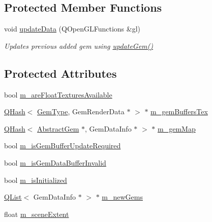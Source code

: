 \subsection*{Protected Member Functions}
\begin{DoxyCompactItemize}
\item 
void \hyperlink{class_gem_renderer_ada5ea2f54e918b16879d378cf84dab42}{update\+Data} (Q\+Open\+G\+L\+Functions \&gl)
\begin{DoxyCompactList}\small\item\em Updates previous added gem using \hyperlink{class_gem_renderer_a4be8d2a7b1443262392adc828f3910c8}{update\+Gem()} \end{DoxyCompactList}\end{DoxyCompactItemize}
\subsection*{Protected Attributes}
\begin{DoxyCompactItemize}
\item 
bool \hyperlink{class_gem_renderer_a09205046ea644ba35327843b208af1de}{m\+\_\+are\+Float\+Textures\+Available}
\item 
\hyperlink{class_q_hash}{Q\+Hash}$<$ \hyperlink{abstractgem_8h_a2f0a34b6dac35a9610cab7a1c5fcb444}{Gem\+Type}, Gem\+Render\+Data $\ast$ $>$ $\ast$ \hyperlink{class_gem_renderer_ac09a5c2581e1500071429a833cf2bc56}{m\+\_\+gem\+Buffers\+Tex}
\item 
\hyperlink{class_q_hash}{Q\+Hash}$<$ \hyperlink{class_abstract_gem}{Abstract\+Gem} $\ast$, Gem\+Data\+Info $\ast$ $>$ $\ast$ \hyperlink{class_gem_renderer_a549290c95d8ca95b163ca0fae08e11c8}{m\+\_\+gem\+Map}
\item 
bool \hyperlink{class_gem_renderer_a1c7545294804fd500e8e02ce106bb6ba}{m\+\_\+is\+Gem\+Buffer\+Update\+Required}
\item 
bool \hyperlink{class_gem_renderer_aabd20f07edbe436be86c9b29d4e05fa8}{m\+\_\+is\+Gem\+Data\+Buffer\+Invalid}
\item 
bool \hyperlink{class_gem_renderer_abedb030e36a36f2faa096727bfdd226d}{m\+\_\+is\+Initialized}
\item 
\hyperlink{class_q_list}{Q\+List}$<$ Gem\+Data\+Info $\ast$ $>$ $\ast$ \hyperlink{class_gem_renderer_ab93df8610036b343cdd98be3cd328aed}{m\+\_\+new\+Gems}
\item 
float \hyperlink{class_gem_renderer_a24391e7dfe1663b9c74210fb0424487d}{m\+\_\+scene\+Extent}
\end{DoxyCompactItemize}


